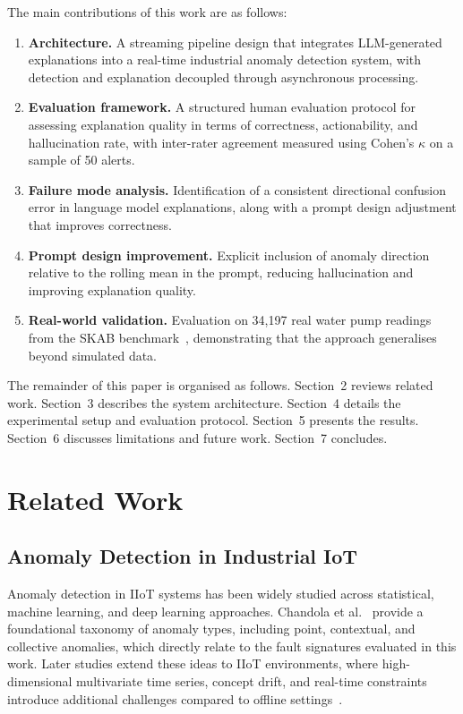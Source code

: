 \documentclass[11pt, a4paper]{article}
\begin{document}
The main contributions of this work are as follows:

\begin{enumerate}
    \item \textbf{Architecture.} A streaming pipeline design that 
    integrates LLM-generated explanations into a real-time industrial 
    anomaly detection system, with detection and explanation decoupled 
    through asynchronous processing.
    
    \item \textbf{Evaluation framework.} A structured human evaluation 
    protocol for assessing explanation quality in terms of correctness, 
    actionability, and hallucination rate, with inter-rater agreement 
    measured using Cohen's $\kappa$ on a sample of 50 alerts.
    
    \item \textbf{Failure mode analysis.} Identification of a consistent 
    directional confusion error in language model explanations, along with 
    a prompt design adjustment that improves correctness.
    
    \item \textbf{Prompt design improvement.} Explicit inclusion of anomaly 
    direction relative to the rolling mean in the prompt, reducing 
    hallucination and improving explanation quality.
    
    \item \textbf{Real-world validation.} Evaluation on 34,197 real water 
    pump readings from the SKAB benchmark~\cite{katser2020skab}, 
    demonstrating that the approach generalises beyond simulated data.
\end{enumerate}

The remainder of this paper is organised as follows. Section~2 reviews 
related work. Section~3 describes the system architecture. Section~4 
details the experimental setup and evaluation protocol. Section~5 presents 
the results. Section~6 discusses limitations and future work. Section~7 
concludes.

\section{Related Work}

\subsection{Anomaly Detection in Industrial IoT}

Anomaly detection in IIoT systems has been widely studied across 
statistical, machine learning, and deep learning approaches. Chandola 
et al.~\cite{chandola2009anomaly} provide a foundational taxonomy of 
anomaly types, including point, contextual, and collective anomalies, 
which directly relate to the fault signatures evaluated in this work. 
Later studies extend these ideas to IIoT environments, where 
high-dimensional multivariate time series, concept drift, and real-time 
constraints introduce additional challenges compared to offline 
settings~\cite{togbe2021anomaly}.
\end{document}
